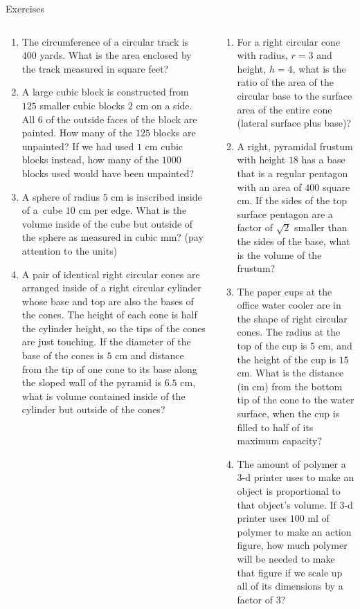\documentclass[9pt,aspectratio=169]{beamer}
\begin{document}
\begin{frame}{Exercises}
  \begin{columns}[T]
    \begin{column}{0.5\textwidth}
      \small
      \begin{enumerate}
        \item The circumference of a circular track is $400$ yards.  What is the area enclosed by the track measured in square feet?
        \item A large cubic block is constructed from $125$ smaller cubic blocks $2$ cm on a side.  All $6$ of the outside faces of the block are painted.  How many of the $125$ blocks are unpainted?  If we had used $1$ cm cubic blocks instead, how many of the $1000$ blocks used would have been unpainted?
        \item A sphere of radius $5$ cm is inscribed inside of a~cube $10$ cm per edge.  What is the volume inside of the cube but outside of the sphere as measured in cubic mm? (pay attention to the units)
        \item A pair of identical right circular cones are arranged inside of a right circular cylinder whose base and top are also the bases of the cones.  The height of each cone is half the cylinder height, so the tips of the cones are just touching.  If the diameter of the base of the cones is $5$ cm and distance from the tip of one cone to its base along the sloped wall of the pyramid is $6.5$ cm, what is volume contained inside of the cylinder but outside of the cones?
        \seti
      \end{enumerate}
    \end{column}
    \begin{column}{0.5\textwidth}
      \small
      \begin{enumerate}
        \conti
        \item For a right circular cone with radius, $r = 3$ and height, $h = 4$, what is the ratio of the area of the circular base to the surface area of the entire cone (lateral surface plus base)? 
        \item A right, pyramidal frustum with height $18$ has a base that is a regular pentagon with an area of $400$ square cm.  If the sides of the top surface pentagon are a factor of $\sqrt{2}$ smaller than the sides of the base, what is the volume of the frustum?
        \item The paper cups at the office water cooler are in the shape of right circular cones.  The radius at the top of the cup is $5$ cm, and the height of the cup is $15$ cm.  What is the distance (in cm) from the bottom tip of the cone to the water surface, when the cup is filled to half of its maximum capacity?
        \item The amount of polymer a 3-d printer uses to make an object is proportional to that object's volume.  If 3-d printer uses $100$ ml of polymer to make an action figure, how much polymer will be needed to make that figure if we scale up all of its dimensions by a factor of $3$?
      \end{enumerate}
    \end{column}
  \end{columns}
\end{frame}
\end{document}
